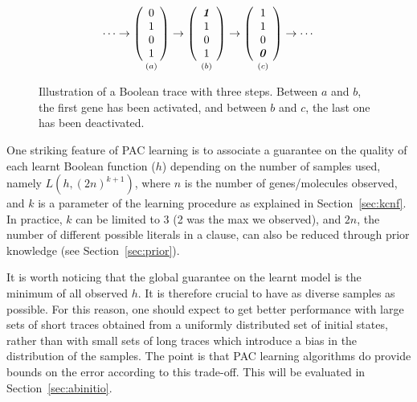 \documentclass{llncs}
\begin{document}
\begin{figure}[htbp]
   {\large 
      \[
         \cdots
         \rightarrow
         \underset{\vspace{1em}(a)}{
            \left(\begin{array}{c}
                  0\\ 1\\ 0\\ 1
         \end{array}\right)}
         \rightarrow
         \underset{\vspace{1em}(b)}{
            \left(\begin{array}{c}
                  \textbf{\textit{1}}\\ 1\\ 0\\ 1
         \end{array}\right)}
         \rightarrow
         \underset{\vspace{1em}(c)}{
            \left(\begin{array}{c}
                  1\\ 1\\ 0\\ \textbf{\textit 0}
         \end{array}\right)}
         \rightarrow
         \cdots
      \]
   }
   \caption{Illustration of a Boolean trace with three steps. Between $a$ and
   $b$, the first gene has been activated, and between $b$ and $c$, the last
   one has been deactivated.}\label{steps}
\end{figure}



One striking feature of PAC learning is to associate a guarantee on the quality of each learnt Boolean
function ($h$) depending on the number of samples used, namely $L(h, (2n)^{k+1})$,
where $n$ is the number of genes/molecules observed, and $k$ is a parameter of
the learning procedure as explained in Section~\ref{sec:kcnf}.
In practice, $k$ can be limited to 3 (2 was the max we observed), and $2n$, the
number of different possible literals in a clause, can also be reduced through
prior knowledge (see Section~\ref{sec:prior}).

It is worth noticing that the global guarantee on the learnt model is the minimum of all observed $h$.
It is therefore crucial to have as diverse samples as possible. 
For this reason, one should expect to get better performance 
with large sets of short traces obtained from a uniformly distributed set of initial states,
rather than with small sets of long traces which introduce a bias in the distribution of the samples.
The point is that PAC learning algorithms do provide bounds on the error according to this trade-off.
This will be evaluated in Section~\ref{sec:abinitio}.
\end{document}
